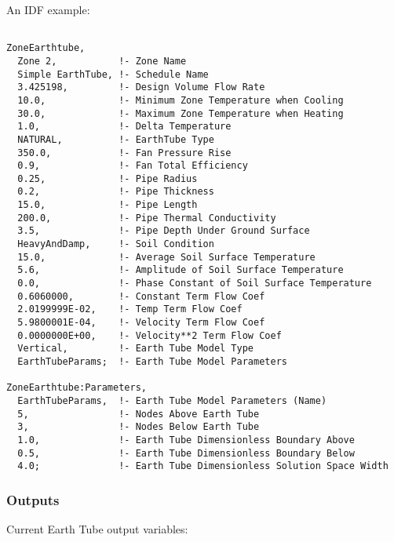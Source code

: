 An IDF example:

\begin{lstlisting}

ZoneEarthtube,
  Zone 2,           !- Zone Name
  Simple EarthTube, !- Schedule Name
  3.425198,         !- Design Volume Flow Rate
  10.0,             !- Minimum Zone Temperature when Cooling
  30.0,             !- Maximum Zone Temperature when Heating
  1.0,              !- Delta Temperature
  NATURAL,          !- EarthTube Type
  350.0,            !- Fan Pressure Rise
  0.9,              !- Fan Total Efficiency
  0.25,             !- Pipe Radius
  0.2,              !- Pipe Thickness
  15.0,             !- Pipe Length
  200.0,            !- Pipe Thermal Conductivity
  3.5,              !- Pipe Depth Under Ground Surface
  HeavyAndDamp,     !- Soil Condition
  15.0,             !- Average Soil Surface Temperature
  5.6,              !- Amplitude of Soil Surface Temperature
  0.0,              !- Phase Constant of Soil Surface Temperature
  0.6060000,        !- Constant Term Flow Coef
  2.0199999E-02,    !- Temp Term Flow Coef
  5.9800001E-04,    !- Velocity Term Flow Coef
  0.0000000E+00,    !- Velocity**2 Term Flow Coef
  Vertical,         !- Earth Tube Model Type
  EarthTubeParams;  !- Earth Tube Model Parameters
  
ZoneEarthtube:Parameters,
  EarthTubeParams,  !- Earth Tube Model Parameters (Name)
  5,                !- Nodes Above Earth Tube
  3,                !- Nodes Below Earth Tube
  1.0,              !- Earth Tube Dimensionless Boundary Above
  0.5,              !- Earth Tube Dimensionless Boundary Below
  4.0;              !- Earth Tube Dimensionless Solution Space Width
\end{lstlisting}

\subsubsection{Outputs}\label{zoneearthtube-outputs}

Current Earth Tube output variables:

